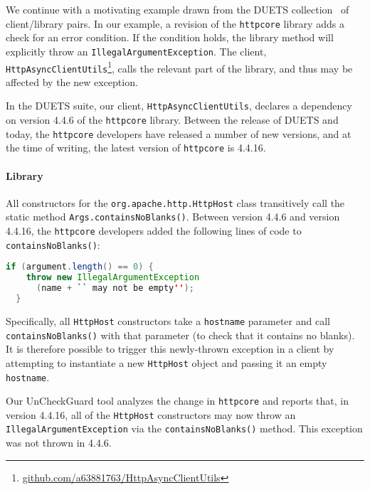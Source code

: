 We continue with a motivating example drawn from the DUETS collection~\cite{durieux21:_duets}
of client/library pairs. 
In our example,
a revision of the \texttt{httpcore} library adds a check for an
error condition.  If the condition holds, the library method will
explicitly throw an \texttt{IllegalArgumentException}. The client, \texttt{HttpAsyncClientUtils}\footnote{\url{github.com/a63881763/HttpAsyncClientUtils}},
calls the relevant part of the library, and thus may be affected by the new exception.

In the DUETS suite, our client, \texttt{HttpAsyncClientUtils}, declares a dependency on
version 4.4.6 of the \texttt{httpcore} library. Between the release of DUETS and today, the \texttt{httpcore} developers
have released a number of new versions, and at the time of writing, the latest version of \texttt{httpcore}
is 4.4.16.

\paragraph{Library} All constructors for the \texttt{org.apache.http.HttpHost} class transitively call
the static method \texttt{Args.containsNoBlanks()}. Between version 4.4.6 and version 4.4.16, the \texttt{httpcore}
developers added the following lines of code to \texttt{containsNoBlanks()}:
\begin{lstlisting}[language=Java]
  if (argument.length() == 0) {
    throw new IllegalArgumentException
      (name + `` may not be empty'');
  }
\end{lstlisting}
Specifically, all \texttt{HttpHost} constructors take a \texttt{hostname} parameter and call \texttt{containsNoBlanks()}
with that parameter (to check that it contains no blanks). It is therefore possible to trigger this newly-thrown
exception in a client by attempting to instantiate a new \texttt{HttpHost} object and passing it an empty
\texttt{hostname}.

Our UnCheckGuard tool analyzes the change in \texttt{httpcore} and reports that, in
version 4.4.16, all of the \texttt{HttpHost} constructors may now throw an
\texttt{IllegalArgumentException} via the \texttt{containsNoBlanks()} method.
This exception was not thrown in 4.4.6.

